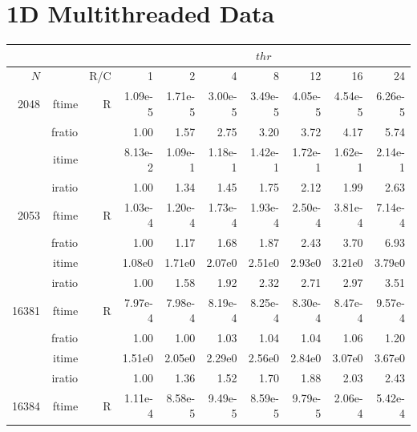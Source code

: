 \documentclass[a4paper]{article}
\begin{document}
\appendix

\section{1D Multithreaded Data}\label{App:1Dthr}


\begin{table}[!htbp]
\begin{center}
\begin{small}
\begin{tabular}{|r|r|r|r|r|r|r|r|r|r|}
\hline 
     \multicolumn{3}{|c|}{ } & \multicolumn{7}{c|}{$thr$} \\ \hline
    $N$  & & R/C  & 1           & 2    & 4    & 8    & 12   & 16    & 24  \\ \hline\hline
    2048  & ftime & R  &  1.09e-5 &   1.71e-5 &   3.00e-5 &   3.49e-5 &   4.05e-5 &   4.54e-5 &   6.26e-5   \\ 
      & fratio & & 1.00 &    1.57 &    2.75 &    3.20 &    3.72 &    4.17 &    5.74   \\ 
     & itime & &  8.13e-2 &    1.09e-1 &   1.18e-1 &   1.42e-1 &   1.72e-1 &   1.62e-1 &   2.14e-1    \\ 
     & iratio & &   1.00 &    1.34 &    1.45 &    1.75 &    2.12 &    1.99 &    2.63    \\ \hline 
    2053  & ftime & R &  1.03e-4 &   1.20e-4 &   1.73e-4 &   1.93e-4 &   2.50e-4 &   3.81e-4 &   7.14e-4    \\ 
      & fratio & & 1.00 &   1.17 &   1.68 &   1.87 &   2.43 &   3.70 &   6.93    \\ 
     & itime &  &   1.08e0 &   1.71e0 &   2.07e0 &   2.51e0 &   2.93e0 &   3.21e0 &   3.79e0   \\ 
    & iratio &  &     1.00 &   1.58 &   1.92 &   2.32 &   2.71 &   2.97 &   3.51     \\ \hline 
  16381  & ftime & R &  7.97e-4 &   7.98e-4 &   8.19e-4 &   8.25e-4 &   8.30e-4 &   8.47e-4 &   9.57e-4     \\ 
      & fratio & &  1.00 &   1.00 &   1.03 &   1.04 &   1.04 &   1.06 &   1.20    \\ 
     & itime & &  1.51e0 &   2.05e0 &   2.29e0 &   2.56e0 &   2.84e0 &   3.07e0 &   3.67e0     \\ 
     & iratio & &  1.00 &   1.36 &   1.52 &   1.70 &   1.88 &   2.03 &   2.43     \\ \hline 
 16384  & ftime & R & 1.11e-4 &   8.58e-5 &   9.49e-5 &   8.59e-5 &   9.79e-5 &   2.06e-4 &   5.42e-4   \\ 

\end{tabular}
\end{small}
\end{center}
\end{table}
\end{document}

